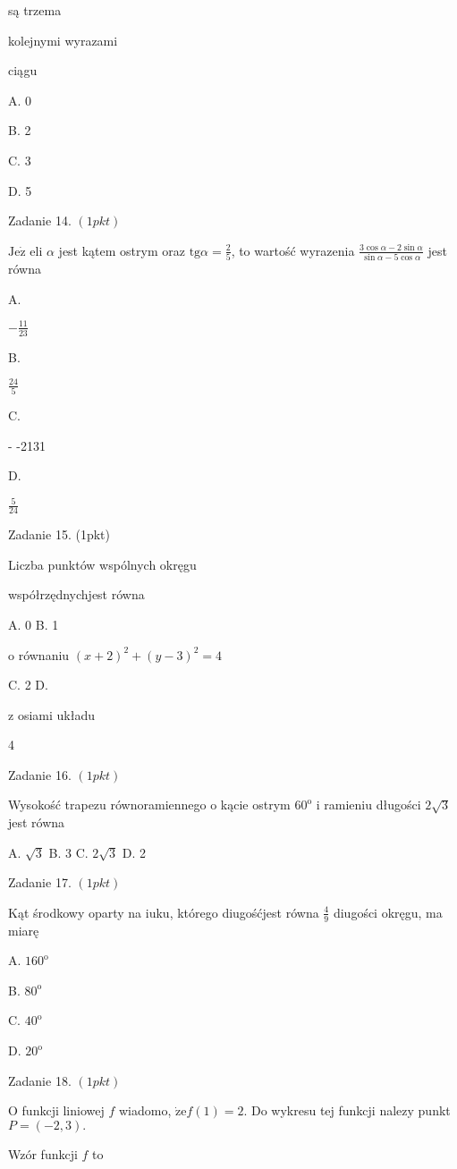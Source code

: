 \documentclass[a4paper,12pt]{article}
\begin{document}
są trzema

kolejnymi wyrazami

ciągu

A. 0

B. 2

C. 3

D. 5

Zadanie 14. $(1pkt)$

$\mathrm{J}\mathrm{e}\dot{\mathrm{z}}$ eli $\alpha$ jest kątem ostrym oraz $\displaystyle \mathrm{t}\mathrm{g}\alpha=\frac{2}{5}$, to wartość wyrazenia $\displaystyle \frac{3\cos\alpha-2\sin\alpha}{\sin\alpha-5\cos\alpha}$ jest równa

A.

$-\displaystyle \frac{11}{23}$

B.

$\displaystyle \frac{24}{5}$

C.

- -2131

D.

$\displaystyle \frac{5}{24}$

Zadanie 15. (1pkt)

Liczba punktów wspólnych okręgu

współrzędnychjest równa

A. 0 B. 1

o równaniu $(x+2)^{2}+(y-3)^{2}=4$

C. 2 D.

z osiami układu

4

Zadanie 16. $(1pkt)$

Wysokość trapezu równoramiennego o kącie ostrym $60^{\mathrm{o}}$ i ramieniu długości $2\sqrt{3}$ jest równa

A. $\sqrt{3}$ B. 3 C. $2\sqrt{3}$ D. 2

Zadanie 17. $(1pkt)$

Kąt środkowy oparty na iuku, którego diugośćjest równa $\displaystyle \frac{4}{9}$ diugości okręgu, ma miarę

A. $160^{\mathrm{o}}$

B. $80^{\mathrm{o}}$

C. $40^{\mathrm{o}}$

D. $20^{\mathrm{o}}$

Zadanie 18. $(1pkt)$

$\mathrm{O}$ funkcji liniowej $f$ wiadomo, $\dot{\mathrm{z}}\mathrm{e}f(1)=2$. Do wykresu tej funkcji nalez$\mathrm{y}$ punkt $P=(-2,3).$

Wzór funkcji $f$ to
\end{document}

